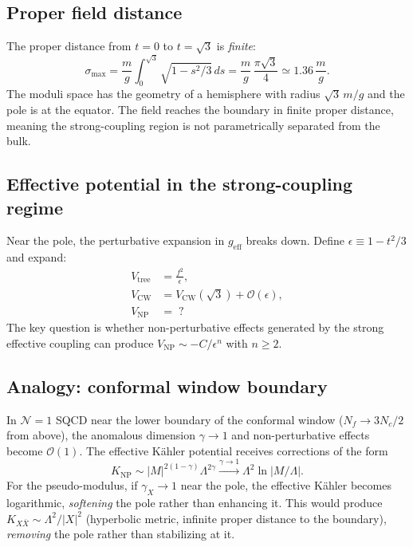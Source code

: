 \subsection{Proper field distance}

The proper distance from $t=0$ to $t=\sqrt{3}$ is \emph{finite}:
\begin{equation}
\sigma_{\max} = \frac{m}{g}\int_0^{\sqrt{3}}\sqrt{1-s^2/3}\,ds
= \frac{m}{g}\,\frac{\pi\sqrt{3}}{4} \simeq 1.36\,\frac{m}{g}.
\end{equation}
The moduli space has the geometry of a hemisphere with radius $\sqrt{3}\,m/g$
and the pole is at the equator. The field reaches the boundary in finite proper distance,
meaning the strong-coupling region is not parametrically separated from the bulk.

\subsection{Effective potential in the strong-coupling regime}

Near the pole, the perturbative expansion in $g_{\text{eff}}$ breaks down.
Define $\epsilon \equiv 1 - t^2/3$ and expand:
\begin{align}
V_{\text{tree}} &= \frac{f^2}{\epsilon}, \\
V_{\text{CW}} &= V_{\text{CW}}(\sqrt{3}) + \mathcal{O}(\epsilon), \\
V_{\text{NP}} &= \;?
\end{align}
The key question is whether non-perturbative effects generated by the strong
effective coupling can produce $V_{\text{NP}} \sim -C/\epsilon^n$ with $n \geq 2$.

\subsection{Analogy: conformal window boundary}

In $\mathcal{N}=1$ SQCD near the lower boundary of the conformal window
($N_f \to 3N_c/2$ from above), the anomalous dimension $\gamma \to 1$ and
non-perturbative effects become $\mathcal{O}(1)$.
The effective K\"ahler potential receives corrections of the form
\begin{equation}
K_{\text{NP}} \sim |M|^{2(1-\gamma)}\Lambda^{2\gamma}
\xrightarrow{\gamma\to 1} \Lambda^2\ln|M/\Lambda|.
\end{equation}
For the pseudo-modulus, if $\gamma_X \to 1$ near the pole, the effective K\"ahler becomes
logarithmic, \emph{softening} the pole rather than enhancing it.
This would produce $K_{X\bar X} \sim \Lambda^2/|X|^2$ (hyperbolic metric, infinite proper
distance to the boundary), \emph{removing} the pole rather than stabilizing at it.

